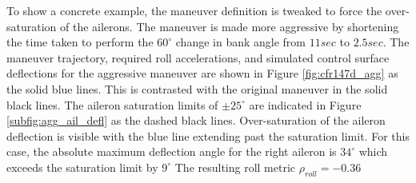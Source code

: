 To show a concrete example, the maneuver definition is tweaked to force the over-saturation of the ailerons.
The maneuver is made more aggressive by shortening the time taken to perform the $60^\circ$ change in bank angle from $11 sec$ to $2.5 sec$.
The maneuver trajectory, required roll accelerations, and simulated control surface deflections for the aggressive maneuver are shown in Figure \ref{fig:cfr147d_agg} as the solid blue lines. 
This is contrasted with the original maneuver in the solid black lines. 
The aileron saturation limits of $\pm 25^\circ$ are indicated in Figure \ref{subfig:agg_ail_defl} as the dashed black lines. 
Over-saturation of the aileron deflection is visible with the blue line extending past the saturation limit. 
For this case, the absolute maximum deflection angle for the right aileron is $34^\circ$ which exceeds the saturation limit by $9^\circ$
The resulting roll metric $\rho_{roll} = -0.36$

